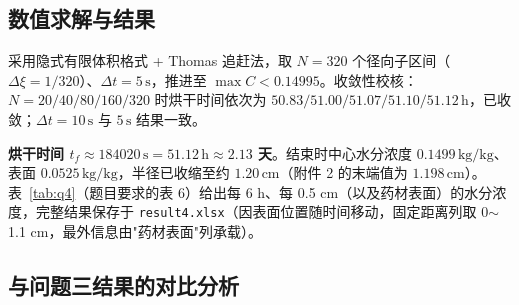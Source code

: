 \documentclass[withoutpreface,bwprint]{cumcmthesis} %
\begin{document}
\subsection{数值求解与结果}

采用隐式有限体积格式 + Thomas 追赶法，取 $N=320$ 个径向子区间（$\Delta\xi=1/320$）、$\Delta t=5\,\mathrm{s}$，推进至 $\max C<0.14995$。收敛性校核：$N=20/40/80/160/320$ 时烘干时间依次为 $50.83/51.00/51.07/51.10/51.12\,\mathrm{h}$，已收敛；$\Delta t=10\,\mathrm{s}$ 与 $5\,\mathrm{s}$ 结果一致。

\textbf{烘干时间 $t_f\approx184020\,\mathrm{s}=51.12\,\mathrm{h}\approx2.13$ 天}。结束时中心水分浓度 $0.1499\,\mathrm{kg/kg}$、表面 $0.0525\,\mathrm{kg/kg}$，半径已收缩至约 $1.20\,\mathrm{cm}$（附件 2 的末端值为 $1.198\,\mathrm{cm}$）。表~\ref{tab:q4}（题目要求的表 6）给出每 6 h、每 0.5 cm（以及药材表面）的水分浓度，完整结果保存于 \texttt{result4.xlsx}（因表面位置随时间移动，固定距离列取 0$\sim$1.1 cm，最外信息由"药材表面"列承载）。

\begin{table}[!htbp]
\centering
\caption{　药材烘干过程的水分浓度（kg/kg，考虑收缩）}
\label{tab:q4}
\end{table}

\subsection{与问题三结果的对比分析}
\end{document}
